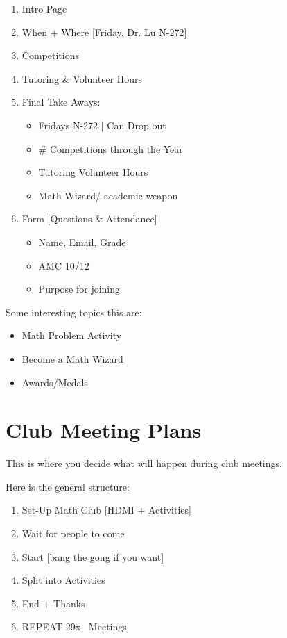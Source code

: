 \begin{enumerate}
    \item Intro Page
    \item When + Where [Friday, Dr. Lu N-272] 
    \item Competitions  
    \item Tutoring \& Volunteer Hours 
    \item Final Take Aways: 
            \begin{itemize}
                \item Fridays N-272  | Can Drop out 
                \item  \# Competitions through the Year 
                \item  Tutoring Volunteer Hours 
                \item  Math Wizard/ academic weapon    
            \end{itemize}
    \item Form [Questions \& Attendance] 
            \begin{itemize}
                \item Name, Email, Grade
                \item AMC 10/12 
                \item Purpose for joining
            \end{itemize}

\end{enumerate}
Some interesting topics this are:

\begin{itemize}
    \item Math Problem Activity
    \item Become a Math Wizard 
    \item Awards/Medals
\end{itemize}

\section{Club Meeting Plans}
This is where you decide what will happen during club meetings.

\noindent
Here is the general structure:
    \begin{enumerate}
        \item Set-Up Math Club [HDMI + Activities]
        \item Wait for people to come 
        \item Start [bang the gong if you want]
        \item Split into Activities
        \item End + Thanks
        \item REPEAT 29x~ Meetings
    \end{enumerate}

